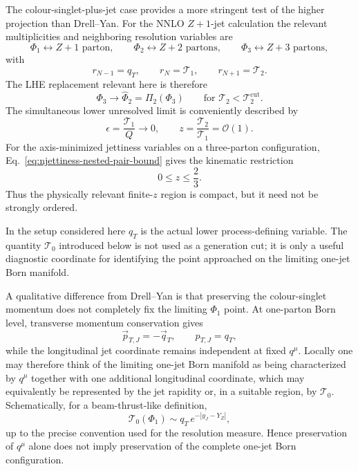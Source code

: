 \documentclass[11pt]{article}
\newcommand{\rnm}{r_{N-1}}
\newcommand{\rn}{r_N}
\newcommand{\rnp}{r_{N+1}}
\newcommand{\cut}{\mathrm{cut}}
\newcommand{\Ph}{\Phi}
\begin{document}
The colour-singlet-plus-jet case provides a more stringent test of the higher projection than Drell--Yan.
For the NNLO $Z+1$-jet calculation the relevant multiplicities and neighboring resolution variables are
\begin{equation}
\Ph_1\leftrightarrow Z+1\text{ parton},\qquad
\Ph_2\leftrightarrow Z+2\text{ partons},\qquad
\Ph_3\leftrightarrow Z+3\text{ partons},
\label{eq:z1j-multiplicities}
\end{equation}
with
\begin{equation}
\rnm=q_T,\qquad
\rn=\mathcal T_1,\qquad
\rnp=\mathcal T_2.
\label{eq:z1j-resolution-identification}
\end{equation}
The LHE replacement relevant here is therefore
\begin{equation}
\Ph_3\longrightarrow
\widehat\Ph_2=\Pi_2(\Ph_3)
\qquad
\text{for }\mathcal T_2<\mathcal T_2^{\cut}.
\label{eq:z1j-higher-projection}
\end{equation}
The simultaneous lower unresolved limit is conveniently described by
\begin{equation}
\epsilon=\frac{\mathcal T_1}{Q}\to0,
\qquad
z=\frac{\mathcal T_2}{\mathcal T_1}=\mathcal O(1).
\label{eq:z1j-simultaneous-limit}
\end{equation}
For the axis-minimized jettiness variables on a three-parton configuration,
Eq.~\eqref{eq:njettiness-nested-pair-bound} gives the kinematic restriction
\begin{equation}
0\le z\le\frac23.
\label{eq:z1j-t2-t1-bound}
\end{equation}
Thus the physically relevant finite-$z$ region is compact, but it need not be strongly ordered.

In the setup considered here $q_T$ is the actual lower process-defining variable. The quantity
$\mathcal T_0$ introduced below is not used as a generation cut; it is only a useful diagnostic coordinate
for identifying the point approached on the limiting one-jet Born manifold.

A qualitative difference from Drell--Yan is that preserving the colour-singlet momentum does not completely
fix the limiting $\Ph_1$ point. At one-parton Born level, transverse momentum conservation gives
\begin{equation}
\vec p_{T,J}=-\vec q_T,
\qquad
p_{T,J}=q_T,
\label{eq:z1j-born-transverse-balance}
\end{equation}
while the longitudinal jet coordinate remains independent at fixed $q^\mu$. Locally one may therefore think
of the limiting one-jet Born manifold as being characterized by $q^\mu$ together with one additional
longitudinal coordinate, which may equivalently be represented by the jet rapidity or, in a suitable region,
by $\mathcal T_0$. Schematically, for a beam-thrust-like definition,
\begin{equation}
\mathcal T_0(\Ph_1)
\sim
q_T\,e^{-|y_J-Y_Z|},
\label{eq:z1j-t0-born-coordinate}
\end{equation}
up to the precise convention used for the resolution measure. Hence preservation of $q^\mu$ alone does not
imply preservation of the complete one-jet Born configuration.
\end{document}
